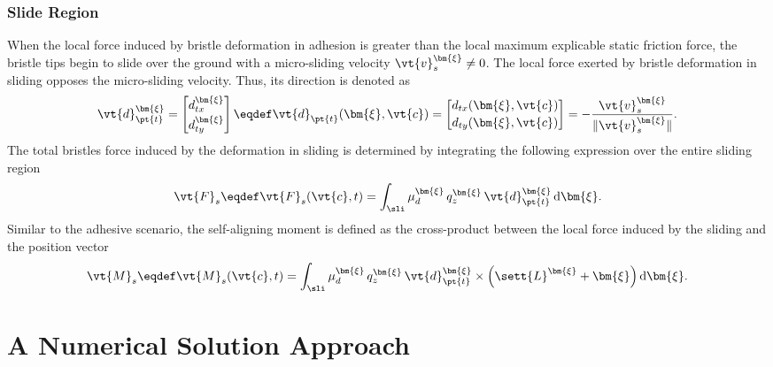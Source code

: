 \subsubsection{Slide Region}

When the local force induced by bristle deformation in adhesion is greater than the local maximum explicable static friction force, the bristle tips begin to slide over the ground with a micro-sliding velocity $\vt{v}_s^{\bm{\xi}} \neq 0$. The local force exerted by bristle deformation in sliding opposes the micro-sliding velocity. Thus, its direction is denoted as
%
\begin{equation}
  \vt{d}_{\pt{t}}^{\bm{\xi}} =
  \begin{bmatrix}
    d_{tx}^{\bm{\xi}} \\[0.2em]
    d_{ty}^{\bm{\xi}}
  \end{bmatrix}
  \eqdef \vt{d}_{\pt{t}}(\bm{\xi},\vt{c}) =
  \begin{bmatrix}
    d_{tx}(\bm{\xi},\vt{c}) \\[0.2em]
    d_{ty}(\bm{\xi},\vt{c})
  \end{bmatrix} =
  -\dfrac{\vt{v}_s^{\bm{\xi}}}{\|{\vt{v}_s^{\bm{\xi}}}\|}.
\end{equation}
%
The total bristles force induced by the deformation in sliding is determined by integrating the following expression over the entire sliding region \sli{}
%
\begin{equation}
  \vt{F}_s \eqdef \vt{F}_s(\vt{c},t) = \int_{\sli} \mu_d^{\bm{\xi}}\,q_z^{\bm{\xi}}\,\vt{d}_{\pt{t}}^{\bm{\xi}} \, \mathrm{d}\bm{\xi}.
\end{equation}
%
Similar to the adhesive scenario, the self-aligning moment is defined as the cross-product between the local force induced by the sliding and the position vector
%
\begin{equation}
  \vt{M}_s \eqdef \vt{M}_s(\vt{c},t) = \int_{\sli} \mu_d^{\bm{\xi}}\,q_z^{\bm{\xi}}\,\vt{d}_{\pt{t}}^{\bm{\xi}} \times \left(\sett{L}^{\bm{\xi}} + \bm{\xi}\right) \mathrm{d}\bm{\xi}.
  \label{chap4:eq:M_s}
\end{equation}


\section{A Numerical Solution Approach}
\label{chap4:sec:numerical_solution}

